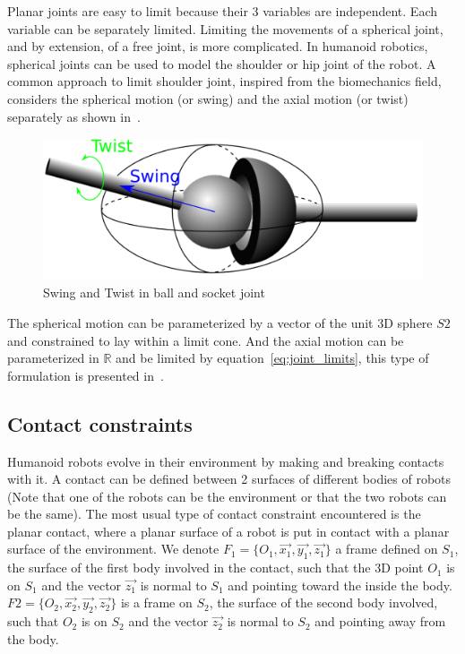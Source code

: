 Planar joints are easy to limit because their 3 variables are independent.
Each variable can be separately limited.
Limiting the movements of a spherical joint, and by extension, of a free joint, is more complicated.
In humanoid robotics, spherical joints can be used to model the shoulder or hip joint of the robot.
A common approach to limit shoulder joint, inspired from the biomechanics field, considers the spherical motion (or swing) and the axial motion (or twist) separately as shown in~.

\begin{figure}[htpb]
  \centering
  \includegraphics[width=0.7\linewidth]{ballAndSocket.pdf}
  \caption{Swing and Twist in ball and socket joint}
\label{fig:ballAndSocket}
\end{figure}

The spherical motion can be parameterized by a vector of the unit 3D sphere $S2$ and constrained to lay within a limit cone. And the axial motion can be parameterized in $\mathbb{R}$ and be limited by equation~\ref{eq:joint_limits}, this type of formulation is presented in~\cite{baerlocher}.



\subsection{Contact constraints}
\label{sub:contact_constraints}


Humanoid robots evolve in their environment by making and breaking contacts with it.
A contact can be defined between 2 surfaces of different bodies of robots (Note that one of the robots can be the environment or that the two robots can be the same).
The most usual type of contact constraint encountered is the planar contact, where a planar surface of a robot is put in contact with a planar surface of the environment.
We denote $F_1 = \{O_1, \vec{x_1}, \vec{y_1}, \vec{z_1}\}$ a frame defined on $S_1$, the surface of the first body involved in the contact, such that the 3D point $O_1$ is on $S_1$ and the vector $\vec{z_1}$ is normal to $S_1$ and pointing toward the inside the body.
$F2 = \{O_2, \vec{x_2}, \vec{y_2}, \vec{z_2}\}$ is a frame on $S_2$, the surface of the second body involved, such that $O_2$ is on $S_2$ and the vector $\vec{z_2}$ is normal to $S_2$ and pointing away from the body.

